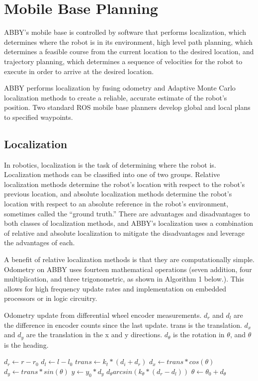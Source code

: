 \documentclass[]{cwru} %
\begin{document}
\section{Mobile Base Planning}


ABBY's mobile base is controlled by software that performs localization,
which determines where the robot is in its environment, high level path
planning, which determines a feasible course from the current location
to the desired location, and trajectory planning, which determines a
sequence of velocities for the robot to execute in order to arrive at
the desired location.

ABBY performs localization by fusing odometry and Adaptive Monte Carlo
localization methods to create a reliable, accurate estimate of the
robot's position. Two standard ROS mobile base planners develop global
and local plans to specified
waypoints.

\subsection{Localization}

In robotics, localization is the task of determining where the robot is.
Localization methods can be classified into one of two groups. Relative
localization methods determine the robot's location with respect to the
robot's previous location, and absolute localization methods determine
the robot's location with respect to an absolute reference in the
robot's environment, sometimes called the ``ground truth.'' There are
advantages and disadvantages to both classes of localization methods,
and ABBY's localization uses a combination of relative and absolute
localization to mitigate the disadvantages and leverage the advantages
of each.

A benefit of relative localization methods is that they are
computationally simple. Odometry on ABBY uses fourteen mathematical
operations (seven addition, four multiplication, and three
trigonometric, as shown in Algorithm 1 below.). This allows for high
frequency update rates and implementation on embedded processors or in
logic circuitry.

\begin{algorithm}
\caption{Odometry update from differential wheel encoder measurements. 
$d_r$ and $d_l$ are the difference in encoder counts since the last update. trans 
is the translation. $d_x$ and $d_y$ are the translation in the x and y directions. 
$d_{\theta}$ is the rotation in $\theta$, and $\theta$ is the heading.}
\label{alg1}
\begin{algorithmic}
\STATE $d_r \gets r - r_0$
\STATE $d_l \gets l - l_0$
\STATE $trans \gets k_t * (d_i + d_r)$
\STATE $d_x \gets trans * cos(\theta)$
\STATE $d_y \gets trans * sin(\theta)$
\STATE $y \gets y_0 * d_y$
\STATE $d_\theta arcsin(k_\theta * (d_r - d_l))$
\STATE $\theta \gets \theta_0 + d_\theta$
\end{algorithmic}
\end{algorithm}
\end{document}
